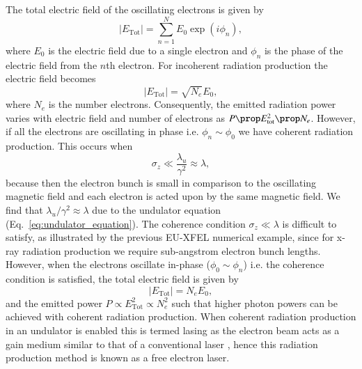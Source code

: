 \documentclass[../main.tex]{subfiles}
\begin{document}
The total electric field of the oscillating electrons is given by
\begin{equation}
\lvert E_{\mathrm{Tot}}\rvert = \sum_{n=1}^{N}E_{0}\exp\left(i\phi_{n}\right),
\label{eq:undulator_bunch_electric_field}    
\end{equation}
where $E_{0}$ is the electric field due to a single electron and $\phi_{n}$ is the phase of the electric field from the $n$th electron. For incoherent radiation production the electric field becomes \cite{wolski2012fel} %
\begin{equation}
\lvert E_{\mathrm{Tot}}\rvert = \sqrt{N_{e}}E_{0},
\label{eq:incoherent_electric_field}
\end{equation}
where $N_{e}$ is the number electrons. Consequently, the emitted radiation power varies with electric field and number of electrons as $P \prop E_{\mathrm{tot}}^{2} \prop N_{e}$. However, if all the electrons are oscillating in phase i.e. $\phi_{n}\sim \phi_{0}$ we have coherent radiation production. This occurs when
\begin{equation}
\sigma_{z} \ll \frac{\lambda_{u}}{\gamma^{2}} \approx \lambda,
\label{eq:coherence_condition}
\end{equation}
because then the electron bunch is small in comparison to the oscillating magnetic field and each electron is acted upon by the same magnetic field. We find that $\lambda_{u}/\gamma^{2} \approx \lambda$ due to the undulator equation (Eq.~\ref{eq:undulator_equation}). The coherence condition $\sigma_{z} \ll \lambda$ is difficult to satisfy, as illustrated by the previous EU-XFEL numerical example, since for x-ray radiation production we require sub-angstrom electron bunch lengths. However, when the electrons oscillate in-phase ($\phi_{0}\sim \phi_{n}$) i.e. the coherence condition is satisfied, the total electric field is given by
\begin{equation}
\lvert E_{\mathrm{Tot}}\rvert = N_{e}E_{0},
\label{eq:coherent_electric_field}    
\end{equation}
and the emitted power $P \propto E_{\mathrm{Tot}}^{2} \propto N_{e}^{2}$ \cite{pellegrini2016physics} such that higher photon powers can be achieved with coherent radiation production. When coherent radiation production in an undulator is enabled this is termed lasing as the electron beam acts as a gain medium similar to that of a conventional laser \cite{brau1988free}, hence this radiation production method is known as a free electron laser. 
\end{document}
